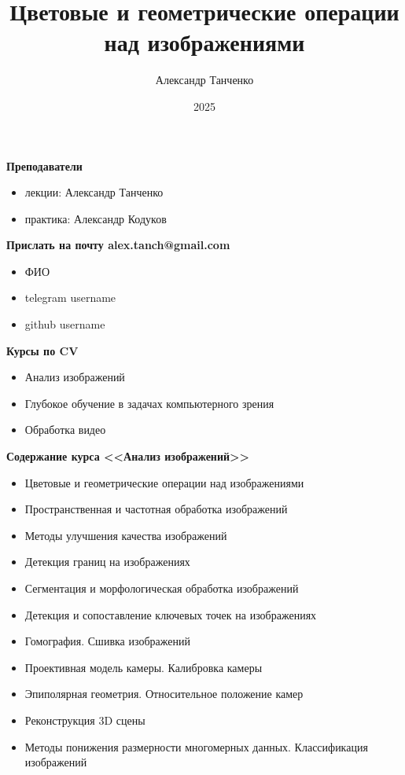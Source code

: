 \documentclass[
    12pt, 
    usepdftitle=false,
    aspectratio=1610
]{beamer}
\title[Лекция 1]{
    Цветовые и геометрические операции над изображениями
}
\author{Александр Танченко}
\institute{}
\date{2025}
\begin{document}
\begin{frame}

\textbf{Преподаватели}
\begin{itemize}
    \item лекции: Александр Танченко
    \item практика: Александр Кодуков
\end{itemize}
\vspace{1cm}

\textbf{Прислать на почту alex.tanch@gmail.com}
\begin{itemize}
    \item ФИО
    \item telegram username
    \item github username
\end{itemize}
\end{frame}

\begin{frame}    
    \textbf{Курсы по CV}
    \vspace{0.2cm}
    \begin{itemize}
    \item Анализ изображений
    \item Глубокое обучение в задачах компьютерного зрения
    \item Обработка видео
    \end{itemize}
\end{frame}

\begin{frame}

\textbf{Содержание курса <<Анализ изображений>>}
\vspace{0.2cm}

\begin{itemize}
    \item Цветовые и геометрические операции над изображениями
    \item Пространственная и частотная обработка изображений
    \item Методы улучшения качества изображений
    \item Детекция границ на изображениях
    \item Сегментация и морфологическая обработка изображений
    \item Детекция и сопоставление ключевых точек на изображениях
    \item Гомография. Сшивка изображений
    \item Проективная модель камеры. Калибровка камеры
    \item Эпиполярная геометрия. Относительное положение камер
    \item Реконструкция 3D сцены
    \item Методы понижения размерности многомерных данных. Классификация изображений
\end{itemize}
\end{frame}
\end{document}
